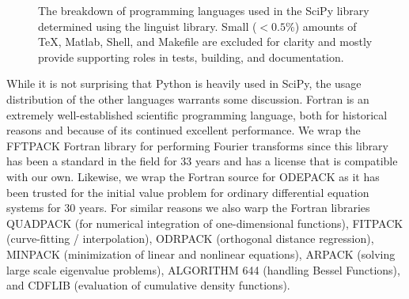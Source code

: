 \documentclass[fleqn,10pt]{wlscirep}
\begin{document}
    \begin{figure}[H]
        \centering

        \caption{The breakdown of programming languages used in the
	         SciPy library determined using the linguist library.
		 Small ($<0.5 \%$) amounts of TeX, Matlab, Shell,
		 and Makefile are excluded for clarity and mostly
		 provide supporting roles in tests, building, and
		 documentation.}
        \label{fig:linguist}
    \end{figure}

While it is not surprising that Python is heavily used in SciPy, the
usage distribution of the other languages warrants some discussion. Fortran
is an extremely well-established scientific programming language, both
for historical reasons and because of its continued excellent
performance\cite{Koelbel:1993:HPF:562354}. We
wrap the FFTPACK Fortran library for performing Fourier
transforms\cite{SWARZTRAUBER198445, SWARZTRAUBER198251} since
this library has been a standard in the field for 33 years and has a license
that is compatible with our own. Likewise, we wrap the Fortran source
for ODEPACK\cite{citeulike:2644528} as it has been  trusted for the initial 
value problem for ordinary differential equation systems for 30 years. For
similar reasons we also warp the Fortran libraries QUADPACK\cite{1983qspa.book.....P} (for numerical
integration of one-dimensional functions), FITPACK\cite{Dierckx:1993:CSF:151103} (curve-fitting /
interpolation), ODRPACK\cite{ODRPACK_Boggs} (orthogonal distance regression),
MINPACK\cite{osti_6997568} (minimization of linear and nonlinear equations),
ARPACK\cite{leh:sor:yan96} (solving large scale eigenvalue problems), 
ALGORITHM 644\cite{Amos:1986:APP:7921.214331} (handling Bessel Functions), and 
CDFLIB\cite{CDFLIB_site} (evaluation of cumulative density functions).
\end{document}

